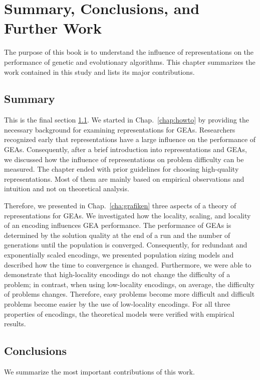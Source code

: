 

\chapter{Summary, Conclusions, and Further Work}
\label{chap:conclusions}
The purpose of this book is to understand  the influence of representations on the performance of genetic and evolutionary algorithms. 
This chapter summarizes the work contained in this study and lists its major contributions.


\section{Summary}
\label{sec:summary}

This is the final section \ref{sec:summary}. We  started in Chap.~\ref{chap:howto} by providing the necessary background for examining representations for  GEAs. Researchers recognized early that representations have a large influence on the performance of GEAs. Consequently, after a brief introduction into representations and GEAs, we discussed how the influence of representations on problem difficulty  can be measured. The chapter ended with prior guidelines for choosing high-quality  representations. Most of them are  mainly based on empirical observations and intuition and not on theoretical analysis.

Therefore, we presented in Chap.~\ref{cha:grafiken} three aspects of a theory of representations for  GEAs. We investigated how the locality, scaling, and locality of an encoding  influences GEA performance. The performance of GEAs is determined by the solution quality at the end of a run and the number of generations until the population is converged. Consequently, for redundant and exponentially scaled encodings, we presented population sizing models and described how the time to convergence is changed.
Furthermore, we were able to demonstrate that high-locality encodings do not change the difficulty of a problem; in contrast, when using low-locality encodings, on average, the difficulty of problems changes. Therefore,  easy problems become more difficult and difficult problems become easier by the use of low-locality encodings.
For all three properties of encodings, the theoretical models were verified with empirical results.


\section{Conclusions}
We  summarize the most important contributions of this work.

